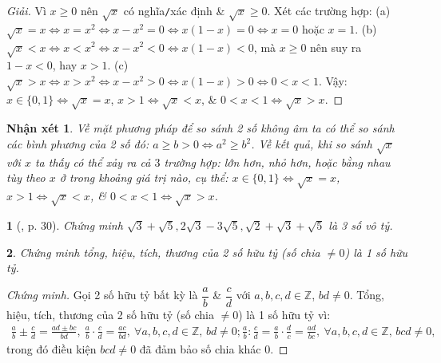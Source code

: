 \documentclass{article}
\newtheorem{baitoan}{}%
\newtheorem{nhanxet}{Nhận xét}
\begin{document}
\begin{proof}[Giải]
	Vì $x\ge0$ nên $\sqrt{x}$ có nghĩa\texttt{/}xác định \& $\sqrt{x}\ge0$. Xét các trường hợp: (a) $\sqrt{x} = x\Leftrightarrow x = x^2\Leftrightarrow x - x^2 = 0\Leftrightarrow x(1 - x) = 0\Leftrightarrow x = 0$ hoặc $x = 1$. (b) $\sqrt{x} < x\Leftrightarrow x < x^2\Leftrightarrow x - x^2 < 0\Leftrightarrow x(1 - x) < 0$, mà $x\ge0$ nên suy ra $1 - x < 0$, hay $x > 1$. (c) $\sqrt{x} > x\Leftrightarrow x > x^2\Leftrightarrow x - x^2 > 0\Leftrightarrow x(1 - x) > 0\Leftrightarrow 0 < x < 1$. Vậy: $x\in\{0,1\}\Leftrightarrow\sqrt{x} = x$, $x > 1\Leftrightarrow\sqrt{x} < x$, \& $0 < x < 1\Leftrightarrow\sqrt{x} > x$.
\end{proof}

\begin{nhanxet}
	Về mặt phương pháp để so sánh 2 số không âm ta có thể so sánh các bình phương của 2 số đó: $a\ge b > 0\Leftrightarrow a^2\ge b^2$. Về kết quả, khi so sánh $\sqrt{x}$ với $x$ ta thấy có thể xảy ra cả $3$ trường hợp: lớn hơn, nhỏ hơn, hoặc bằng nhau tùy theo $x$ ở trong khoảng giá trị nào, cụ thể: $x\in\{0,1\}\Leftrightarrow\sqrt{x} = x$, $x > 1\Leftrightarrow\sqrt{x} < x$, \& $0 < x < 1\Leftrightarrow\sqrt{x} > x$.
\end{nhanxet}

\begin{baitoan}[\cite{Binh_boi_duong_Toan_9_tap_1}, p. 30]
	Chứng minh $\sqrt{3} + \sqrt{5},2\sqrt{3} - 3\sqrt{5},\sqrt{2} + \sqrt{3} + \sqrt{5}$ là 3 số vô tỷ.
\end{baitoan}

\begin{baitoan}
	Chứng minh tổng, hiệu, tích, thương của 2 số hữu tỷ (số chia $\ne0$) là 1 số hữu tỷ.
\end{baitoan}

\begin{proof}[Chứng minh]
	Gọi 2 số hữu tỷ bất kỳ là $\dfrac{a}{b}$ \& $\dfrac{c}{d}$ với $a,b,c,d\in\mathbb{Z}$, $bd\ne0$. Tổng, hiệu, tích, thương của 2 số hữu tỷ (số chia $\ne0$) là 1 số hữu tỷ vì:
	\begin{align*}
		\frac{a}{b}\pm\frac{c}{d} = \frac{ad\pm bc}{bd},\ \frac{a}{b}\cdot\frac{c}{d} = \frac{ac}{bd},\ \forall a,b,c,d\in\mathbb{Z},\,bd\ne0; \frac{a}{b}:\frac{c}{d} = \frac{a}{b}\cdot\frac{d}{c} = \frac{ad}{bc},\ \forall a,b,c,d\in\mathbb{Z},\,bcd\ne0,
	\end{align*}
	trong đó điều kiện $bcd\ne0$ đã đảm bảo số chia khác 0.
\end{proof}
\end{document}
